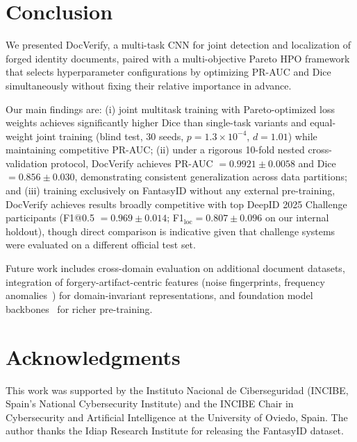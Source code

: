 
\section{Conclusion}
\label{sec:conclusion}

We presented DocVerify, a multi-task CNN for joint detection and localization of
forged identity documents, paired with a multi-objective Pareto HPO framework
that selects hyperparameter configurations by optimizing PR-AUC and Dice
simultaneously without fixing their relative importance in advance.

Our main findings are: (i) joint multitask training with Pareto-optimized loss
weights achieves significantly higher Dice than single-task variants and
equal-weight joint training (blind test, 30 seeds, $p = 1.3 \times 10^{-4}$,
$d = 1.01$) while maintaining competitive PR-AUC; (ii) under a rigorous 10-fold
nested cross-validation protocol, DocVerify achieves PR-AUC $= 0.9921 \pm
0.0058$ and Dice $= 0.856 \pm 0.030$, demonstrating consistent generalization
across data partitions; and (iii) training exclusively on FantasyID without any external pre-training,
DocVerify achieves results broadly competitive with top DeepID 2025 Challenge
participants (F1@0.5 $= 0.969 \pm 0.014$; F1$_{\text{loc}} = 0.807 \pm 0.096$
on our internal holdout), though direct comparison is indicative given that
challenge systems were evaluated on a different official test set.

Future work includes cross-domain evaluation on additional document datasets,
integration of forgery-artifact-centric features (noise fingerprints, frequency
anomalies~\citep{cozzolino2020noiseprint}) for domain-invariant representations, and
foundation model backbones~\citep{fakeidet2025} for richer pre-training.

\section*{Acknowledgments}
This work was supported by the Instituto Nacional de Ciberseguridad (INCIBE,
Spain's National Cybersecurity Institute) and the INCIBE Chair in Cybersecurity
and Artificial Intelligence at the University of Oviedo, Spain. The author thanks
the Idiap Research Institute for releasing the FantasyID dataset.
